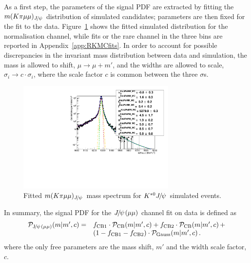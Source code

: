 As a first step, the parameters of the signal PDF are extracted by fitting the $\mcKpimm_{\jpsi}$ distribution 
of \BdToKstJPsmm simulated candidates; parameters are then fixed for the fit to the data.
Figure~\ref{fig:mumu_MC_fits_main} shows the fitted simulated distribution for the normalisation channel, while
fits or the rare channel in the three \qsq bins are reported in Appendix~\ref{app:RKMCfits}.
In order to account for possible discrepancies in the invariant mass distribution between data and simulation, the mass is allowed to shift, $\mu \rightarrow \mu +m'$, and the widths are allowed to scale, $\sigma_i \rightarrow c \cdot \sigma_i$, where 
the scale factor $c$ is common between the three $\sigma$s.
%
\begin{figure}[h!]
\centering \includegraphics[width=0.7\textwidth]{RKst/figs/Fit/fit_MM/KstJPsMM_MC_log.pdf}
\caption{Fitted $m(K\pi \mu\mu)_{\jpsi}$ mass spectrum for $\Kstarz\jpsi$ simulated events. }
\label{fig:mumu_MC_fits_main}
\end{figure}
%
%

In summary, the signal PDF for the $\jpsi(\mu\mu)$ channel fit on data is defined as
%
\begin{equation*}
\begin{array}{rl}
\mathcal{P}_{\rm \jpsi(\mu\mu)}(m | m', c) = &
f_{\rm CB1} \cdot \mathcal{P}_{\rm CB}(m | m', c) + 
f_{\rm CB2} \cdot \mathcal{P}_{\rm CB}(m | m', c) \,+ \\ 
& (1 - f_{\rm CB1} -f_{\rm CB2}) \cdot \mathcal{P}_{\rm Gauss}(m | m', c) \, .$$
\end{array}
\end{equation*}
%
where the only free parameters are the mass shift, $m'$ and the width scale factor, $c$.


